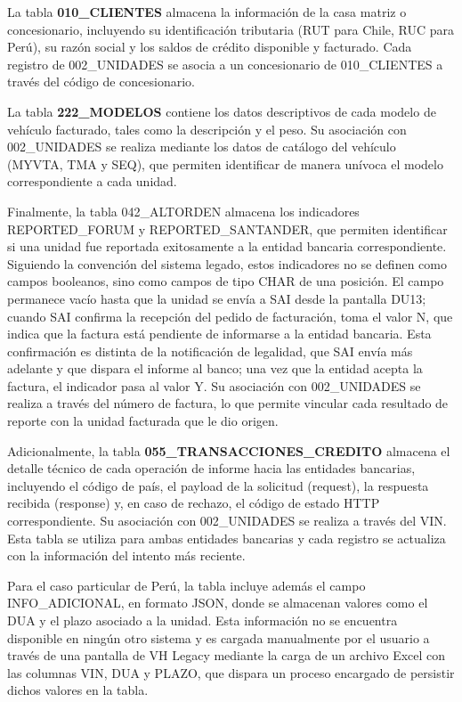 La tabla \textbf{010\_CLIENTES} almacena la información de la casa matriz o concesionario, incluyendo su identificación tributaria (RUT para Chile, RUC para Perú), su razón social y los saldos de crédito disponible y facturado. Cada registro de 002\_UNIDADES se asocia a un concesionario de 010\_CLIENTES a través del código de concesionario.

La tabla \textbf{222\_MODELOS} contiene los datos descriptivos de cada modelo de vehículo facturado, tales como la descripción y el peso. Su asociación con 002\_UNIDADES se realiza mediante los datos de catálogo del vehículo (MYVTA, TMA y SEQ), que permiten identificar de manera unívoca el modelo correspondiente a cada unidad.

Finalmente, la tabla 042\_ALTORDEN almacena los indicadores REPORTED\_FORUM y REPORTED\_SANTANDER, que permiten identificar si una unidad fue reportada exitosamente a la entidad bancaria correspondiente. Siguiendo la convención del sistema legado, estos indicadores no se definen como campos booleanos, sino como campos de tipo CHAR de una posición. El campo permanece vacío hasta que la unidad se envía a SAI desde la pantalla DU13; cuando SAI confirma la recepción del pedido de facturación, toma el valor N, que indica que la factura está pendiente de informarse a la entidad bancaria. Esta confirmación es distinta de la notificación de legalidad, que SAI envía más adelante y que dispara el informe al banco; una vez que la entidad acepta la factura, el indicador pasa al valor Y. Su asociación con 002\_UNIDADES se realiza a través del número de factura, lo que permite vincular cada resultado de reporte con la unidad facturada que le dio origen.

Adicionalmente, la tabla \textbf{055\_TRANSACCIONES\_CREDITO} almacena el detalle técnico de cada operación de informe hacia las entidades bancarias, incluyendo el código de país, el payload de la solicitud (request), la respuesta recibida (response) y, en caso de rechazo, el código de estado HTTP correspondiente. Su asociación con 002\_UNIDADES se realiza a través del VIN. Esta tabla se utiliza para ambas entidades bancarias y cada registro se actualiza con la información del intento más reciente.

Para el caso particular de Perú, la tabla incluye además el campo INFO\_ADICIONAL, en formato JSON, donde se almacenan valores como el DUA y el plazo asociado a la unidad. Esta información no se encuentra disponible en ningún otro sistema y es cargada manualmente por el usuario a través de una pantalla de VH Legacy mediante la carga de un archivo Excel con las columnas VIN, DUA y PLAZO, que dispara un proceso encargado de persistir dichos valores en la tabla.


